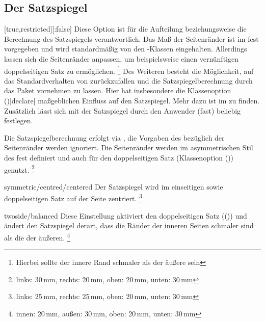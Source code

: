 \begin{Declaration*}{}
\begin{Declaration*}{}
\begin{Declaration*}{}
\subsection{Der Satzspiegel}
%
%
\begin{Declaration}[%
  v2.03;
  v2.05!\Option{cdgeometry=restricted};%
  v2.05!\Option{cdgeometry=adapted};%
  v2.05!\Option{cdgeometry=calculated};%
  v2.05!\Option{cdgeometry=custom};%
]{}[true,restricted][:false]%
\printdeclarationlist%
%
%
%
Diese Option ist für die Aufteilung beziehungsweise die Berechnung des 
Satzspiegels verantwortlich. Das Maß der Seitenränder ist im \CD fest 
vorgegeben und wird standardmäßig von den \TUDScript-Klassen eingehalten. 
Allerdings lassen sich die Seitenränder anpassen, um beispielsweise einen 
vernünftigen doppelseitigen Satz zu ermöglichen.%
\footnote{Hierbei sollte der innere Rand schmaler als der äußere sein}
Des Weiteren besteht die Möglichkeit, auf das Standardverhalten von 
\KOMAScript{} zurückzufallen und die Satzspiegelberechnung durch das Paket 
 vornehmen zu lassen. Hier hat insbesondere die Klassenoption 
()|declare| maßgeblichen Einfluss auf den 
Satzspiegel. Mehr dazu ist im  zu finden.
Zusätzlich lässt sich mit  der Satzspiegel durch den 
Anwender (fast) beliebig festlegen.
%
\begin{values}{}
\itemfalse
  Die Satzspiegelberechnung erfolgt via , die Vorgaben des 
  \CDs bezüglich der Seitenränder werden ignoriert.
\itemtrue*[asymmetric/cd]
  Die Seitenränder werden im asymmetrischen Stil des \CDs fest definiert und 
  auch für den doppelseitigen Satz
  (Klassenoption ()) genutzt.%
  \footnote{links: 30\,mm, rechts: 20\,mm, oben: 20\,mm, unten: 30\,mm}
\item[symmetric/centred/centered]
  Der Satzspiegel wird im einseitigen sowie doppelseitigen Satz auf der Seite 
  zentriert.%
  \footnote{links: 25\,mm, rechts: 25\,mm, oben: 20\,mm, unten: 30\,mm}
\item[twoside/balanced]
  Diese Einstellung aktiviert den doppelseitigen Satz 
  (()) und ändert den Satzspiegel 
  derart, dass die Ränder der inneren Seiten schmaler sind als die der äußeren.%
  \footnote{innen: 20\,mm, außen: 30\,mm, oben: 20\,mm, unten: 30\,mm}

\end{values}
\end{Declaration}
\end{Declaration*}
\end{Declaration*}
\end{Declaration*}
